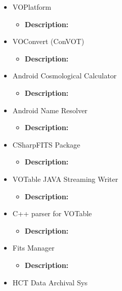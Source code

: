 \begin{itemize}
\begin{itemize}
		\item VOPlatform
            \begin{itemize}
                \item \textbf{Description:}
            \end{itemize}
		\item VOConvert (ConVOT)
            \begin{itemize}
                \item \textbf{Description:}
            \end{itemize}
		\item Android Cosmological Calculator
            \begin{itemize}
                \item \textbf{Description:}
            \end{itemize}
		\item Android Name Resolver
            \begin{itemize}
                \item \textbf{Description:}
            \end{itemize}
		\item CSharpFITS Package
            \begin{itemize}
                \item \textbf{Description:}
            \end{itemize}
		\item VOTable JAVA Streaming Writer
            \begin{itemize}
                \item \textbf{Description:}
            \end{itemize}
		\item C++ parser for VOTable
            \begin{itemize}
                \item \textbf{Description:}
            \end{itemize}
		\item Fits Manager
            \begin{itemize}
                \item \textbf{Description:}
            \end{itemize}
		\item HCT Data Archival Sys
	\end{itemize}
\end{itemize}
